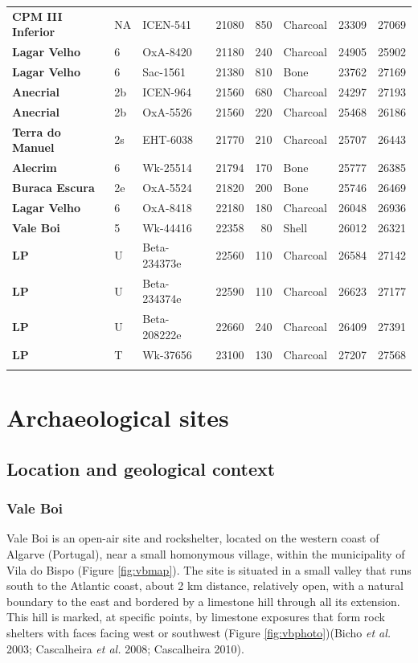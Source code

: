 \documentclass[12pt,twoside]{reedthesis}
\begin{document}
\begin{landscape}
\begin{longtable}[t]{>{\bfseries}lllrrlrr}
CPM III Inferior & NA & ICEN-541 & 21080 & 850 & Charcoal & 23309 & 27069\\
Lagar Velho & 6 & OxA-8420 & 21180 & 240 & Charcoal & 24905 & 25902\\
Lagar Velho & 6 & Sac-1561 & 21380 & 810 & Bone & 23762 & 27169\\
\addlinespace
Anecrial & 2b & ICEN-964 & 21560 & 680 & Charcoal & 24297 & 27193\\
Anecrial & 2b & OxA-5526 & 21560 & 220 & Charcoal & 25468 & 26186\\
Terra do Manuel & 2s & EHT-6038 & 21770 & 210 & Charcoal & 25707 & 26443\\
Alecrim & 6 & Wk-25514 & 21794 & 170 & Bone & 25777 & 26385\\
Buraca Escura & 2e & OxA-5524 & 21820 & 200 & Bone & 25746 & 26469\\
\addlinespace
Lagar Velho & 6 & OxA-8418 & 22180 & 180 & Charcoal & 26048 & 26936\\
Vale Boi & 5 & Wk-44416 & 22358 & 80 & Shell & 26012 & 26321\\
LP & U & Beta-234373e & 22560 & 110 & Charcoal & 26584 & 27142\\
LP & U & Beta-234374e & 22590 & 110 & Charcoal & 26623 & 27177\\
LP & U & Beta-208222e & 22660 & 240 & Charcoal & 26409 & 27391\\
\addlinespace
LP & T & Wk-37656 & 23100 & 130 & Charcoal & 27207 & 27568\\*
\end{longtable}
\endgroup{}
\end{landscape}
\hypertarget{archaeological-sites}{%
\chapter{Archaeological sites}\label{archaeological-sites}}

\hypertarget{location-and-geological-context}{%
\section{Location and geological context}\label{location-and-geological-context}}

\hypertarget{vale-boi}{%
\subsection{Vale Boi}\label{vale-boi}}

Vale Boi is an open-air site and rockshelter, located on the western coast of Algarve (Portugal), near a small homonymous village, within the municipality of Vila do Bispo (Figure \ref{fig:vbmap}). The site is situated in a small valley that runs south to the Atlantic coast, about 2 km distance, relatively open, with a natural boundary to the east and bordered by a limestone hill through all its extension. This hill is marked, at specific points, by limestone exposures that form rock shelters with faces facing west or southwest (Figure \ref{fig:vbphoto})(Bicho \emph{et al.} 2003; Cascalheira \emph{et al.} 2008; Cascalheira 2010).
\end{document}
